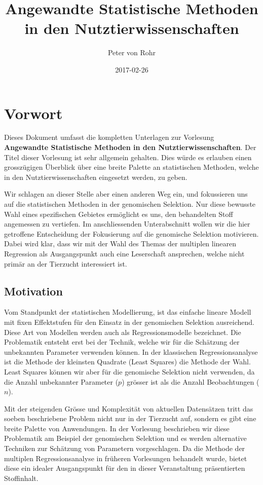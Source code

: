 \documentclass[]{book}
\title{Angewandte Statistische Methoden in den Nutztierwissenschaften}
\author{Peter von Rohr}
\date{2017-02-26}
\begin{document}
\maketitle

{
\setcounter{tocdepth}{1}
\tableofcontents
}
\chapter*{Vorwort}\label{vorwort}

Dieses Dokument umfasst die kompletten Unterlagen zur Vorlesung
\textbf{Angewandte Statistische Methoden in den Nutztierwissenschaften}.
Der Titel dieser Vorlesung ist sehr allgemein gehalten. Dies würde es
erlauben einen grosszügigen Überblick über eine breite Palette an
statistischen Methoden, welche in den Nutztierwissenschaften eingesetzt
werden, zu geben.

Wir schlagen an dieser Stelle aber einen anderen Weg ein, und
fokussieren uns auf die statistischen Methoden in der genomischen
Selektion. Nur diese bewusste Wahl eines spezifischen Gebietes
ermöglicht es uns, den behandelten Stoff angemessen zu vertiefen. Im
anschliessenden Unterabschnitt wollen wir die hier getroffene
Entscheidung der Fokusierung auf die genomische Selektion motivieren.
Dabei wird klar, dass wir mit der Wahl des Themas der multiplen linearen
Regression als Ausgangspunkt auch eine Leserschaft ansprechen, welche
nicht primär an der Tierzucht interessiert ist.

\section*{Motivation}\label{motivation}

Vom Standpunkt der statistischen Modellierung, ist das einfache lineare
Modell mit fixen Effektstufen für den Einsatz in der genomischen
Selektion ausreichend. Diese Art von Modellen werden auch als
Regressionsmodelle bezeichnet. Die Problematik entsteht erst bei der
Technik, welche wir für die Schätzung der unbekannten Parameter
verwenden können. In der klassischen Regressionsanalyse ist die Methode
der kleinsten Quadrate (Least Squares) die Methode der Wahl. Least
Squares können wir aber für die genomische Selektion nicht verwenden, da
die Anzahl unbekannter Parameter (\(p\)) grösser ist als die Anzahl
Beobachtungen (\(n\)).

Mit der steigenden Grösse und Komplexität von aktuellen Datensätzen
tritt das soeben beschriebene Problem nicht nur in der Tierzucht auf,
sondern es gibt eine breite Palette von Anwendungen. In der Vorlesung
beschrieben wir diese Problematik am Beispiel der genomischen Selektion
und es werden alternative Techniken zur Schätzung von Parametern
vorgeschlagen. Da die Methode der multiplen Regressionsanalyse in
früheren Vorlesungen behandelt wurde, bietet diese ein idealer
Ausgangspunkt für den in dieser Veranstaltung präsentierten Stoffinhalt.
\end{document}
